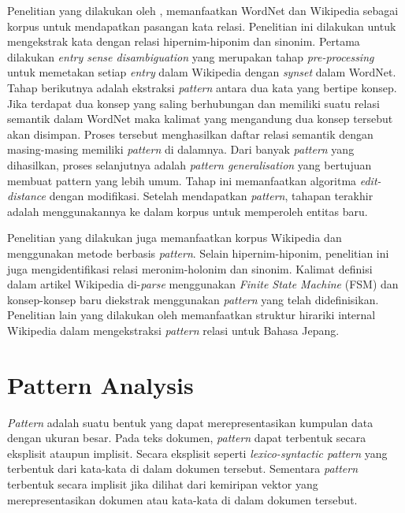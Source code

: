 Penelitian yang dilakukan oleh \cite{ruiz2005automatic}, memanfaatkan WordNet dan Wikipedia sebagai korpus untuk mendapatkan pasangan kata relasi. Penelitian ini dilakukan untuk mengekstrak kata dengan relasi hipernim-hiponim dan sinonim. Pertama dilakukan \textit{entry sense disambiguation} yang merupakan tahap \textit{pre-processing} untuk memetakan setiap \textit{entry} dalam Wikipedia dengan \textit{synset} dalam WordNet. Tahap berikutnya adalah ekstraksi \textit{pattern} antara dua kata yang bertipe konsep. Jika terdapat dua konsep yang saling berhubungan dan memiliki suatu relasi semantik dalam WordNet maka kalimat yang mengandung dua konsep tersebut akan disimpan. Proses tersebut menghasilkan daftar relasi semantik dengan masing-masing memiliki \textit{pattern} di dalamnya. Dari banyak \textit{pattern} yang dihasilkan, proses selanjutnya adalah \textit{pattern generalisation} yang bertujuan membuat pattern yang lebih umum. Tahap ini memanfaatkan algoritma \textit{edit-distance} dengan modifikasi. Setelah mendapatkan \textit{pattern}, tahapan terakhir adalah menggunakannya ke dalam korpus untuk memperoleh entitas baru.

Penelitian yang dilakukan \cite{arnold2014extracting} juga memanfaatkan korpus Wikipedia dan menggunakan metode berbasis \textit{pattern}. Selain hipernim-hiponim, penelitian ini juga mengidentifikasi relasi meronim-holonim dan sinonim. Kalimat definisi dalam artikel Wikipedia di-\textit{parse} menggunakan \textit{Finite State Machine} (FSM) dan konsep-konsep baru diekstrak menggunakan \textit{pattern} yang telah didefinisikan. Penelitian lain yang dilakukan oleh \cite{sumida2008hacking} memanfaatkan struktur hirariki internal Wikipedia dalam mengekstraksi \textit{pattern} relasi untuk Bahasa Jepang. 


\section{Pattern Analysis}
\textit{Pattern} adalah suatu bentuk yang dapat merepresentasikan kumpulan data dengan ukuran besar. Pada teks dokumen, \textit{pattern} dapat terbentuk secara eksplisit ataupun implisit. Secara eksplisit seperti \textit{lexico-syntactic pattern} yang terbentuk dari kata-kata di dalam dokumen tersebut. Sementara \textit{pattern} terbentuk secara implisit jika dilihat dari kemiripan vektor yang merepresentasikan dokumen atau kata-kata di dalam dokumen tersebut.

